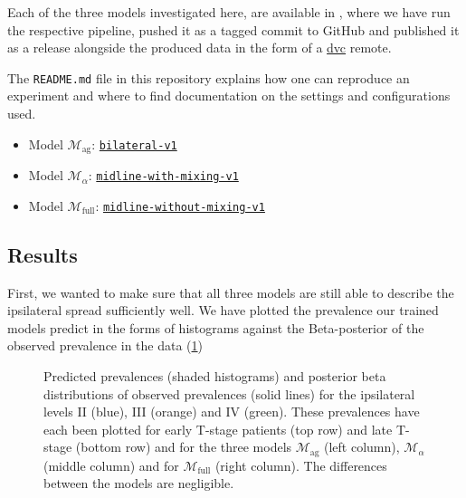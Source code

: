 \documentclass[\relativeRoot/main.tex]{subfiles}
\begin{document}
\begin{tcolorbox}[title=Reproducibility]
    Each of the three models investigated here, are available in , where we have run the respective pipeline, pushed it as a tagged commit to GitHub and published it as a release alongside the produced data in the form of a \href{https://dvc.org}{\gls{dvc}} remote.

    The \texttt{README.md} file in this repository explains how one can reproduce an experiment and where to find documentation on the settings and configurations used.

    \begin{itemize}
        \item Model $\mathcal{M}_\text{ag}$: \href{https://github.com/rmnldwg/lynference/releases/tag/bilateral-v1}{\texttt{bilateral-v1}}
        \item Model $\mathcal{M}_\alpha$: \href{https://github.com/rmnldwg/lynference/releases/tag/midline-with-mixing-v1}{\texttt{midline-with-mixing-v1}}
        \item Model $\mathcal{M}_\text{full}$: \href{https://github.com/rmnldwg/lynference/releases/tag/midline-without-mixing-v1}{\texttt{midline-without-mixing-v1}}
    \end{itemize}
\end{tcolorbox}

\subsection*{Results}
\label{subsec:bilateral:model_comp:results}

First, we wanted to make sure that all three models are still able to describe the ipsilateral spread sufficiently well. We have plotted the prevalence our trained models predict in the forms of histograms against the Beta-posterior of the observed prevalence in the data (\cref{fig:bilateral:model_comp:ipsi})

\begin{figure}
    \def\svgwidth{1.0\textwidth}
    
    \caption{
        Predicted prevalences (shaded histograms) and posterior beta distributions of observed prevalences (solid lines) for the ipsilateral levels II (blue), III (orange) and IV (green). These prevalences have each been plotted for early T-stage patients (top row) and late T-stage (bottom row) and for the three models $\mathcal{M}_\text{ag}$ (left column), $\mathcal{M}_\alpha$ (middle column) and for $\mathcal{M}_\text{full}$ (right column). The differences between the models are negligible.
    }
    \label{fig:bilateral:model_comp:ipsi}
\end{figure}
\end{document}
